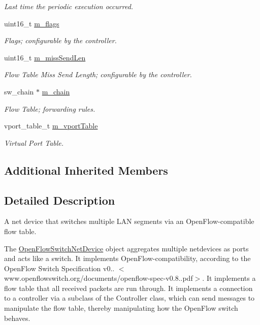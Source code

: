 \begin{DoxyCompactItemize}
\begin{DoxyCompactList}\small\item\em Last time the periodic execution occurred. \end{DoxyCompactList}\item 
uint16\+\_\+t \hyperlink{classns3_1_1OpenFlowSwitchNetDevice_a5bce0e985237e957abf794d3dd6416be}{m\+\_\+flags}
\begin{DoxyCompactList}\small\item\em Flags; configurable by the controller. \end{DoxyCompactList}\item 
uint16\+\_\+t \hyperlink{classns3_1_1OpenFlowSwitchNetDevice_a7437e1b44dc68e7f7f2efc1fabae7fdd}{m\+\_\+miss\+Send\+Len}
\begin{DoxyCompactList}\small\item\em Flow Table Miss Send Length; configurable by the controller. \end{DoxyCompactList}\item 
sw\+\_\+chain $\ast$ \hyperlink{classns3_1_1OpenFlowSwitchNetDevice_aebd93d8b1a9c5c52077e02487953cfe4}{m\+\_\+chain}
\begin{DoxyCompactList}\small\item\em Flow Table; forwarding rules. \end{DoxyCompactList}\item 
vport\+\_\+table\+\_\+t \hyperlink{classns3_1_1OpenFlowSwitchNetDevice_a454c503adcde4d4636a36bbd2ee37855}{m\+\_\+vport\+Table}
\begin{DoxyCompactList}\small\item\em Virtual Port Table. \end{DoxyCompactList}\end{DoxyCompactItemize}
\subsection*{Additional Inherited Members}


\subsection{Detailed Description}
A net device that switches multiple L\+AN segments via an Open\+Flow-\/compatible flow table. 

The \hyperlink{classns3_1_1OpenFlowSwitchNetDevice}{Open\+Flow\+Switch\+Net\+Device} object aggregates multiple netdevices as ports and acts like a switch. It implements Open\+Flow-\/compatibility, according to the Open\+Flow Switch Specification v0.. $<$www.\+openflowswitch.\+org/documents/openflow-\/spec-\/v0.8..\+pdf$>$. It implements a flow table that all received packets are run through. It implements a connection to a controller via a subclass of the Controller class, which can send messages to manipulate the flow table, thereby manipulating how the Open\+Flow switch behaves.

